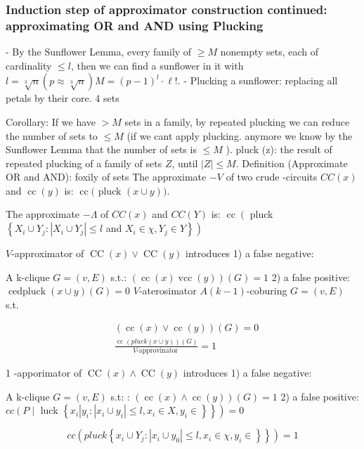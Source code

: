 \subsubsection{Induction step of approximator construction continued: approximating OR and AND using Plucking}
- By the Sunflower Lemma, every family of $\geq M$ nonempty sets, each of cardinality $\leqslant l$, then we can find a sunflower in it with $l=\sqrt[3]{n}(p \approx \sqrt[3]{n}) M=(p-1)^l \cdot \ell!$.
- Plucking a sunflower: replacing all petals by their core. 4 sets

Corollary: If we have $>M$ sets in a family, by repeated plucking we can reduce the number of sets to $\leq M$ (if we cant apply plucking. anymore we know by the Sunflower Lemma that the number of sets is $\leqslant M$ ).
pluck (z): the result of repeated plucking of a family of sets $Z$, until $|Z| \leqslant M$.
Definition (Approximate OR and AND): foxily of sets The approximate $-V$ of two crude -circuits $C C(x)$ and $\operatorname{cc}(y)$ is: $\operatorname{cc}($ pluck $(x \cup y))$.

The approximate $-\Lambda$ of $C C(x)$ and $C C(Y)$ is: $\operatorname{cc}\left(\right.$ pluck $\left\{X_i \cup Y_j:\left|X_i \cup Y_j\right| \leqslant l\right.$ and $\left.\left.X_i \in \chi, Y_j \in Y\right\}\right)$





$V$-approximator of $\operatorname{CC}(x) \vee \operatorname{CC}(y)$ introduces
1) a false negative:

A k-clique $G=(v, E)$ s.t.: $(\operatorname{cc}(x) \operatorname{vcc}(y))(G)=1$
2) a false positive:
$\operatorname{cedpluck}(x \cup y)(G)=0$
$V$-aterosimator
$A(k-1)$-coburing $G=(v, E)$ s.t.

$$
\begin{aligned}
& (\operatorname{cc}(x) \vee \operatorname{cc}(y))(G)=0 \\
& \frac{\operatorname{cc}(p l u c k(x \cup y))(G)}{V \text {-approvinator }}=1
\end{aligned}
$$


1 -apporimator of $\operatorname{CC}(x) \wedge \operatorname{CC}(y)$ introduces
1) a false negative:

A k-clique $G=(v, E)$ s.t: : $(\operatorname{cc}(x) \wedge \operatorname{cc}(y))(G)=1$
2) a false positive: $c c\left(P \mid\right.$ luck $\left.\left\{x_i\left|y_i:\left|x_i \cup y_i\right| \leq l, x_i \in X, y_i \in\right\}\right\}\right)=0$

$$
\left.c c\left(p l u c k\left\{x_i \cup Y_j:\left|x_i \cup y_0\right| \leq l, x_i \in \chi, y_i \in\right\}\right\}\right)=1
$$




